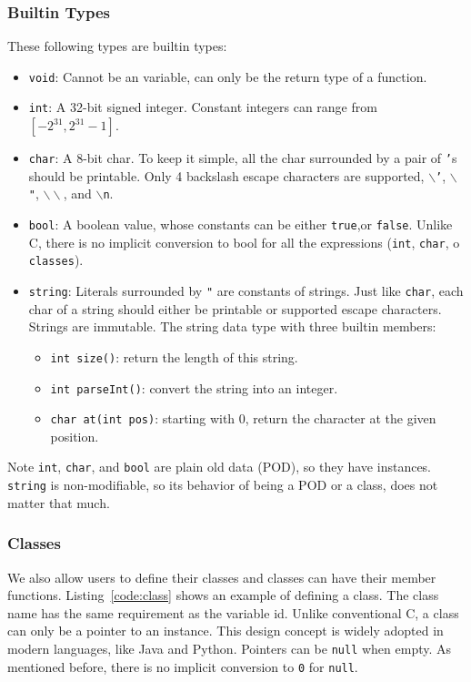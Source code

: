 \documentclass{article}
\begin{document}
\subsubsection{Builtin Types}
These following types are builtin types:
\begin{itemize}
  \item \texttt{void}: Cannot be an variable, can only be the return type of a function.
  \item \texttt{int}: A 32-bit signed integer. Constant integers can range from $[-2^{31},2^{31}-1]$.
  \item \texttt{char}: A 8-bit char. To keep it simple, all the char surrounded by a pair of
    \texttt{'}s should be printable.
    Only 4 backslash escape characters are supported, $\backslash$\texttt{'}, $\backslash$\texttt{"},
    $\backslash\backslash$, and $\backslash$\texttt{n}.
  \item \texttt{bool}: A boolean value, whose constants can be either \texttt{true},or \texttt{false}.
    Unlike C, there is no implicit conversion to bool for all the expressions (\texttt{int}, \texttt{char}, o \texttt{classes}).
  \item \texttt{string}: Literals surrounded by \texttt{"} are constants of strings. Just like
    \texttt{char}, each char of a string should either be printable or supported escape characters.
    Strings are immutable.
    The string data type with three builtin members:
    \begin{itemize}
      \item \texttt{int size()}: return the length of this string.
      \item \texttt{int parseInt()}: convert the string into an integer.
      \item \texttt{char at(int pos)}: starting with 0, return the character at the given position.
    \end{itemize}
\end{itemize}

Note \texttt{int}, \texttt{char}, and \texttt{bool} are plain old data (POD), so they have instances.
\texttt{string} is non-modifiable, so its behavior of being a POD or a class,
does not matter that much.


\subsubsection{Classes}

We also allow users to define their classes and classes can have their member functions.
Listing~\ref{code:class} shows an example of defining a class.
The class name has the same requirement as the variable id.
Unlike conventional C, a class can only be a pointer to an instance.
This design concept is widely adopted in modern languages, like Java and Python.
Pointers can be \texttt{null} when empty. As mentioned before, there is no implicit conversion
to \texttt{0} for \texttt{null}.
\end{document}
